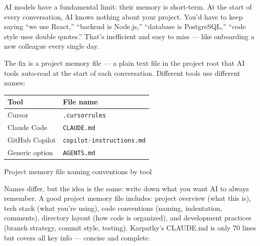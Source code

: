 


AI models have a fundamental limit: their memory is short-term. At the start of every conversation, AI knows nothing about your project. You'd have to keep saying “we use React,” “backend is Node.js,” “database is PostgreSQL,” “code style uses double quotes.” That's inefficient and easy to miss — like onboarding a new colleague every single day.

The fix is a project memory file — a plain text file in the project root that AI tools auto-read at the start of each conversation. Different tools use different names:

\begin{center}
\begin{tabularx}{\linewidth}{|X|X|}
\hline
\textbf{Tool} & \textbf{File name} \tabularnewline
\hline
Cursor & \texttt{.\allowbreak cursorrules} \tabularnewline
Claude Code & \texttt{CLAUDE.\allowbreak md} \tabularnewline
GitHub Copilot & \texttt{copilot-\allowbreak instructions.\allowbreak md} \tabularnewline
Generic option & \texttt{AGENTS.\allowbreak md} \tabularnewline
\hline
\end{tabularx}
\end{center}

\begin{center}\small\color{gray}Project memory file naming conventions by tool\end{center}

Names differ, but the idea is the same: write down what you want AI to always remember. A good project memory file includes: project overview (what this is), tech stack (what you're using), code conventions (naming, indentation, comments), directory layout (how code is organized), and development practices (branch strategy, commit style, testing). Karpathy's CLAUDE.md is only 70 lines but covers all key info — concise and complete.


